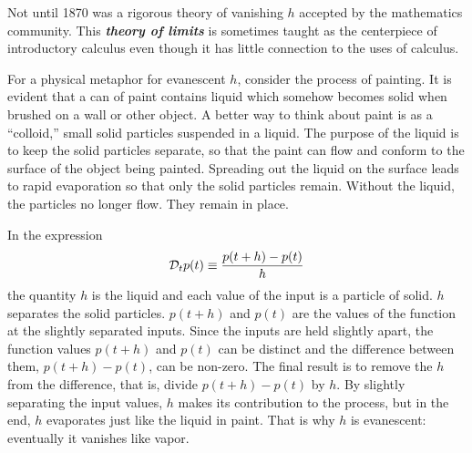 \documentclass[
  letterpaper,
  DIV=11,
  numbers=noendperiod,
  oneside]{scrreprt}
\begin{document}
Not until 1870 was a rigorous theory of vanishing \(h\) accepted by the
mathematics community. This \textbf{\emph{theory of limits}} is
sometimes taught as the centerpiece of introductory calculus even though
it has little connection to the uses of calculus.


For a physical metaphor for evanescent \(h\), consider the process of
painting. It is evident that a can of paint contains liquid which
somehow becomes solid when brushed on a wall or other object. A better
way to think about paint is as a ``colloid,'' small solid particles
suspended in a liquid. The purpose of the liquid is to keep the solid
particles separate, so that the paint can flow and conform to the
surface of the object being painted. Spreading out the liquid on the
surface leads to rapid evaporation so that only the solid particles
remain. Without the liquid, the particles no longer flow. They remain in
place.

In the expression \[{\cal D}_t p(t) \equiv \frac{p(t+h) - p(t)}{h}\] the
quantity \(h\) is the liquid and each value of the input is a particle
of solid. \(h\) separates the solid particles. \(p(t+h)\) and \(p(t)\)
are the values of the function at the slightly separated inputs. Since
the inputs are held slightly apart, the function values \(p(t+h)\) and
\(p(t)\) can be distinct and the difference between them,
\(p(t+h) - p(t)\), can be non-zero. The final result is to remove the
\(h\) from the difference, that is, divide \(p(t+h)-p(t)\) by \(h\). By
slightly separating the input values, \(h\) makes its contribution to
the process, but in the end, \(h\) evaporates just like the liquid in
paint. That is why \(h\) is evanescent: eventually it vanishes like
vapor.
\end{document}
